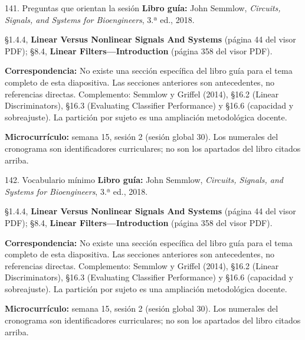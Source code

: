 \documentclass[
  10pt,
  ignorenonframetext,
  aspectratio=169,
  spanish,
]{beamer}
\begin{document}
\begin{frame}{141. Preguntas que orientan la sesión}
\label{preguntas-que-orientan-la-sesiuxf3n-9}
\textbf{Libro guía:} John Semmlow, \emph{Circuits, Signals, and Systems
for Bioengineers}, 3.ª ed., 2018.

§1.4.4, \textbf{Linear Versus Nonlinear Signals And Systems} (página 44
del visor PDF); §8.4, \textbf{Linear Filters---Introduction} (página 358
del visor PDF).

\textbf{Correspondencia:} No existe una sección específica del libro
guía para el tema completo de esta diapositiva. Las secciones anteriores
son antecedentes, no referencias directas. Complemento: Semmlow y
Griffel (2014), §16.2 (Linear Discriminators), §16.3 (Evaluating
Classifier Performance) y §16.6 (capacidad y sobreajuste). La partición
por sujeto es una ampliación metodológica docente.

\textbf{Microcurrículo:} semana 15, sesión 2 (sesión global 30). Los
numerales del cronograma son identificadores curriculares; no son los
apartados del libro citados arriba.
\end{frame}

\begin{frame}{142. Vocabulario mínimo}
\label{vocabulario-muxednimo-9}
\textbf{Libro guía:} John Semmlow, \emph{Circuits, Signals, and Systems
for Bioengineers}, 3.ª ed., 2018.

§1.4.4, \textbf{Linear Versus Nonlinear Signals And Systems} (página 44
del visor PDF); §8.4, \textbf{Linear Filters---Introduction} (página 358
del visor PDF).

\textbf{Correspondencia:} No existe una sección específica del libro
guía para el tema completo de esta diapositiva. Las secciones anteriores
son antecedentes, no referencias directas. Complemento: Semmlow y
Griffel (2014), §16.2 (Linear Discriminators), §16.3 (Evaluating
Classifier Performance) y §16.6 (capacidad y sobreajuste). La partición
por sujeto es una ampliación metodológica docente.

\textbf{Microcurrículo:} semana 15, sesión 2 (sesión global 30). Los
numerales del cronograma son identificadores curriculares; no son los
apartados del libro citados arriba.
\end{frame}
\end{document}
